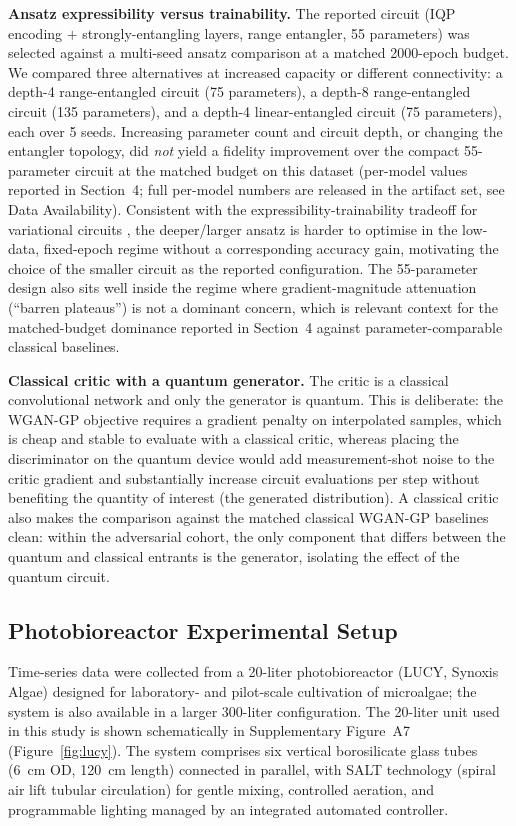 \documentclass[12pt,twocolumn]{article}
\begin{document}
\textbf{Ansatz expressibility versus trainability.} The reported circuit
(IQP encoding $+$ strongly-entangling layers, range entangler, 55 parameters)
was selected against a multi-seed ansatz comparison at a matched 2000-epoch
budget. We compared three alternatives at increased capacity or different
connectivity: a depth-4 range-entangled circuit (75 parameters), a depth-8
range-entangled circuit (135 parameters), and a depth-4 linear-entangled
circuit (75 parameters), each over 5 seeds. Increasing parameter count and
circuit depth, or changing the entangler topology, did \emph{not} yield a
fidelity improvement over the compact 55-parameter circuit at the matched
budget on this dataset (per-model values reported in Section~4; full
per-model numbers are released in the artifact set, see Data
Availability). Consistent with the
expressibility-trainability
tradeoff for variational circuits \cite{mcclean2018barren, holmes2022barrenexpressibility},
the deeper/larger ansatz is harder to
optimise in the low-data, fixed-epoch regime without a corresponding accuracy
gain, motivating the choice of the smaller circuit as the reported
configuration. The 55-parameter design also sits well inside the regime where
gradient-magnitude attenuation (``barren plateaus'') is not a dominant concern,
which is relevant context for the matched-budget dominance reported in
Section~4 against parameter-comparable classical baselines.

\textbf{Classical critic with a quantum generator.} The critic is a classical
convolutional network and only the generator is quantum. This is deliberate:
the WGAN-GP objective requires a gradient penalty on interpolated samples,
which is cheap and stable to evaluate with a classical critic, whereas placing
the discriminator on the quantum device would add measurement-shot noise to
the critic gradient and substantially increase circuit evaluations per step
without benefiting the quantity of interest (the generated distribution). A
classical critic also makes the comparison against the matched classical
WGAN-GP baselines clean: within the adversarial cohort, the only component
that differs between the quantum and classical entrants is the generator,
isolating the effect of the quantum circuit.

\subsection{Photobioreactor Experimental Setup}

Time-series data were collected from a 20-liter photobioreactor (LUCY\textregistered, Synoxis Algae) designed for laboratory- and pilot-scale cultivation of microalgae; the system is also available in a larger 300-liter configuration. The 20-liter unit used in this study is shown schematically in Supplementary Figure~A7 (Figure~\ref{fig:lucy}). The system comprises six vertical borosilicate glass tubes (6~cm OD, 120~cm length) connected in parallel, with SALT technology (spiral air lift tubular circulation) for gentle mixing, controlled aeration, and programmable lighting managed by an integrated automated controller.  
\end{document}
